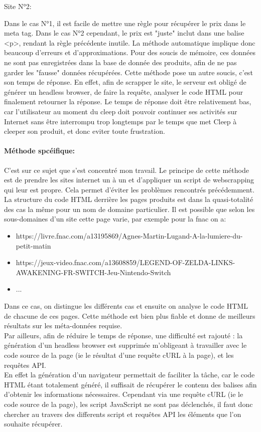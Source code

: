 \documentclass{article} %
\begin{document}
Site N°2:


Dans le cas N°1, il est facile de mettre une règle pour récupérer le prix dans le meta tag. Dans le cas N°2 cependant, le prix est "juste" inclut dans une balise <p>, rendant la règle précédente inutile. La méthode automatique implique donc beaucoup d'erreurs et d'approximations. Pour des soucis de mémoire, ces données ne sont pas enregistrées dans la base de donnée des produits, afin de ne pas garder les "fausse" données récupérées.
Cette méthode pose un autre soucis, c'est son temps de réponse. En effet, afin de scrapper le site, le serveur est obligé de générer un headless browser, de faire la requête, analyser le code HTML pour finalement retourner la réponse. Le temps de réponse doit être relativement bas, car l'utilisateur au moment du cleep doit pouvoir continuer ses activités sur Internet sans être interrompu trop longtemps par le temps que met Cleep à cleeper son produit, et donc eviter toute frustration.

\paragraph{Méthode spcéifique:\\}
C'est sur ce sujet que s'est concentré mon travail. Le principe de cette méthode est de prendre les sites internet un à un et d'appliquer un script de webscrapping qui leur est propre. Cela permet d'éviter les problèmes rencontrés précédemment.
La structure du code HTML derrière les pages produits est dans la quasi-totalité des cas la même pour un nom de domaine particulier. Il est possible que selon les sous-domaines d'un site cette page varie, par exemple pour la fnac on a:
\begin{itemize}
	\itemsep 0em
	\item https://livre.fnac.com/a13195869/Agnes-Martin-Lugand-A-la-lumiere-du-petit-matin
	\item https://jeux-video.fnac.com/a13608859/LEGEND-OF-ZELDA-LINKS-AWAKENING-FR-SWITCH-Jeu-Nintendo-Switch
	\item ...
\end{itemize}
Dans ce cas, on distingue les différents cas et ensuite on analyse le code HTML de chacune de ces pages. Cette méthode est bien plus fiable et donne de meilleurs résultats sur les méta-données requise.\\
Par ailleurs, afin de réduire le temps de réponse, une difficulté est rajouté : la génération d'un headless browser est supprimée m'obligeant à travailler avec le code source de la page (ie le résultat d'une requête cURL à la page), et les requêtes API.\\
En effet la génération d'un navigateur permettait de faciliter la tâche, car le code HTML étant totalement généré, il suffisait de récupérer le contenu des balises afin d'obtenir les informations nécessaires. Cependant via une requête cURL (ie le code source de la page), les script JavaScript ne sont pas déclenchés, il faut donc chercher au travers des differents script et requêtes API les éléments que l'on souhaite récupérer.
\end{document}
